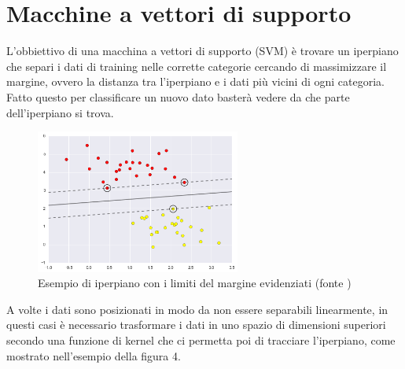 \documentclass[a4paper,12pt]{report}
\begin{document}
\section{Macchine a vettori di supporto}

L'obbiettivo di una macchina a vettori di supporto (SVM) è trovare un iperpiano
che separi i dati di training nelle corrette categorie cercando di massimizzare
il margine, ovvero la distanza tra l'iperpiano e i dati più vicini di ogni
categoria. Fatto questo per classificare un nuovo dato basterà vedere da che
parte dell'iperpiano si trova.

\begin{figure}[h]
	\centering
	\includegraphics[width =0.6\textwidth]{Immagini/SVM margine.png}
	\caption{Esempio di iperpiano con i limiti del margine evidenziati (fonte \cite{Data science handbook})} 
	
\end{figure}

A volte i dati sono posizionati in modo da non essere separabili linearmente, in
questi casi è necessario trasformare i dati in uno spazio di dimensioni
superiori secondo una funzione di kernel che ci permetta poi di tracciare
l'iperpiano, come mostrato nell'esempio della figura 4. 
\end{document}
